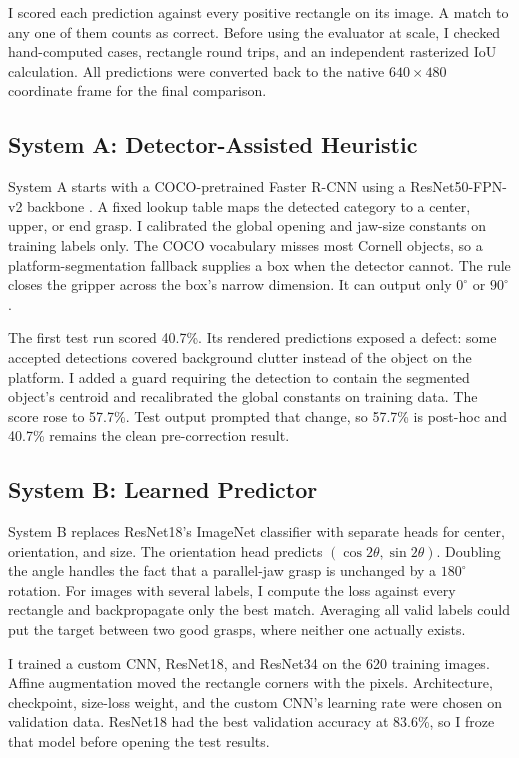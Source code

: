 \documentclass[10pt,conference,compsoc]{IEEEtran}
\begin{document}
I scored each prediction against every positive rectangle on its image. A
match to any one of them counts as correct. Before using the evaluator at
scale, I checked hand-computed cases, rectangle round trips, and an independent
rasterized IoU calculation. All predictions were converted back to the native
$640\times480$ coordinate frame for the final comparison.

\subsection{System A: Detector-Assisted Heuristic}

System A starts with a COCO-pretrained Faster R-CNN using a
ResNet50-FPN-v2 backbone \cite{ren2015}. A fixed lookup table maps the detected
category to a center, upper, or end grasp. I calibrated the global opening and
jaw-size constants on training labels only. The COCO vocabulary misses most
Cornell objects, so a platform-segmentation fallback supplies a box when the
detector cannot. The rule closes the gripper across the box's narrow
dimension. It can output only $0^\circ$ or $90^\circ$.

The first test run scored 40.7\%. Its rendered predictions exposed a defect:
some accepted detections covered background clutter instead of the object on
the platform. I added a guard requiring the detection to contain the
segmented object's centroid and recalibrated the global constants on training
data. The score rose to 57.7\%. Test output prompted that change, so 57.7\%
is post-hoc and 40.7\% remains the clean pre-correction result.

\subsection{System B: Learned Predictor}

System B replaces ResNet18's ImageNet classifier \cite{he2016} with separate
heads for center, orientation, and size. The orientation head predicts
$(\cos 2\theta,\sin 2\theta)$. Doubling the angle handles the fact that a
parallel-jaw grasp is unchanged by a $180^\circ$ rotation. For images with
several labels, I compute the loss against every rectangle and backpropagate
only the best match. Averaging all valid labels could put the target between
two good grasps, where neither one actually exists.

I trained a custom CNN, ResNet18, and ResNet34 on the 620 training images.
Affine augmentation moved the rectangle corners with the pixels. Architecture,
checkpoint, size-loss weight, and the custom CNN's learning rate were chosen
on validation data. ResNet18 had the best validation accuracy at 83.6\%, so I
froze that model before opening the test results.
\end{document}
